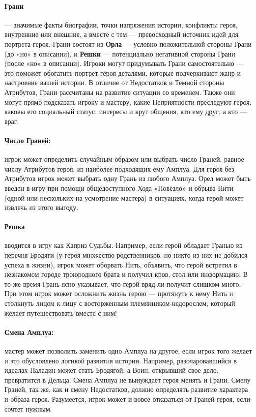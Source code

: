 \paragraph{Грани} — значимые факты биографии, точки напряжения истории, конфликты героя, внутренние или внешние, а вместе с тем — превосходный источник идей для портрета героя. Грани состоят из \textbf{Орла} — условно положительной стороны Грани (до «но» в описании), и \textbf{Решки} — потенциально негативной стороны Грани (после «но» в описании). Игроки могут придумывать Грани самостоятельно — это поможет обогатить портрет героя деталями, которые подчеркивают жанр и настроение вашей истории.
В отличие от Недостатков и Темной стороны Атрибутов, Грани
рассчитаны на развитие ситуации со временем. Также они могут
прямо подсказать игроку и мастеру, какие Неприятности преследуют героя, каковы его социальный статус, интересы и круг общения, кто ему друг, а кто — враг.
\paragraph{Число Граней:} игрок может определить случайным образом или выбрать число Граней, равное числу Атрибутов героя, из наиболее подходящих ему Амплуа. Для героя без Атрибутов игрок может выбрать одну Грань из любого Амплуа. Орел может быть введен в игру при помощи общедоступного Хода
«Повезло» и обрыва Нити (одной или нескольких на усмотрение мастера) в ситуациях, когда герой может извлечь из этого выгоду.
\paragraph{Решка} вводится в игру как Каприз Судьбы.
Например, если герой обладает Гранью из перечня Бродяги (у героя множество родственников, но никто из них не добился успеха в жизни), игрок может оборвать Нить, объявить, что герой встретил в незнакомом городе троюродного брата и получил кров, стол или информацию. В то же время Грань ясно указывает, что герой вряд ли получит слишком много. При этом игрок может осложнить жизнь герою — протянуть к нему Нить и столкнуть лицом к лицу с восторженным племянником-недорослем, который желает путешествовать вместе с ним!
\paragraph{Смена Амплуа:} мастер может позволить заменить одно Амплуа на другое, если игрок того желает и это обусловлено логикой развития истории. Например, разочаровавшийся в идеалах Паладин может стать Бродягой, а Воин, открывший свое дело, превратится в Дельца. Смена Амплуа не вынуждает героя менять и Грани. Смену Граней, так же, как и смену Недостатков, должно определять развитие характера и образа героя. Разумеется, игрок может и вовсе отказаться от Граней героя, если сочтет нужным.
\newline
{}
